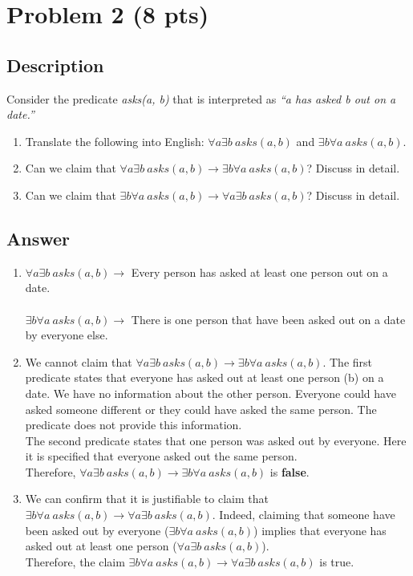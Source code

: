 \newpage

\section{Problem 2 (8 pts)}
\subsection{Description}

Consider the predicate \textit{asks(a, b)} that is interpreted as \textit{``a has asked b out on a date.''}
\begin{enumerate}
\item Translate the following into English: $\forall a \exists b~asks(a, b)$ and $\exists b \forall a ~asks(a, b)$.
\item Can we claim that $\forall a \exists b~asks(a, b) \rightarrow \exists b \forall a ~asks(a, b)$? Discuss in detail.
\item Can we claim that $\exists b \forall a ~asks(a, b) \rightarrow \forall a \exists b~asks(a, b)$? Discuss in detail.
\end{enumerate}

\subsection{Answer}

\begin{enumerate}
  \item $\forall a \exists b~asks(a, b)\rightarrow$ Every person has asked at least one person out on a date.\\
  \\
  $\exists b \forall a~asks(a, b)\rightarrow$ There is one person that have been asked out on a date by everyone else.
  \item  We cannot claim that
  $\forall a \exists b~asks(a, b) \rightarrow \exists b \forall a ~asks(a, b)$. 
  The first predicate states that everyone has asked out at least one person (b) on a date. We have no information
  about the other person. Everyone could have asked someone different or they could have asked the same person. The
  predicate does not provide this information.\\
  The second predicate states that one person was asked out by everyone. Here it is specified that everyone asked out
  the same person.\\
  Therefore,
  $\forall a \exists b~asks(a, b) \rightarrow \exists b \forall a ~asks(a, b)$
   is \textbf{false}.
  \item We can confirm that it is justifiable to claim that
  $\exists b \forall a ~asks(a, b) \rightarrow \forall a \exists b~asks(a, b)$.
  Indeed, claiming that someone have been asked out by everyone ($\exists b \forall a ~asks(a, b)$) implies that 
  everyone has asked out at least one person ($\forall a \exists b~asks(a, b)$).\\
  Therefore, the claim
  $\exists b \forall a ~asks(a, b) \rightarrow \forall a \exists b~asks(a, b)$
  is true.
\end{enumerate}
